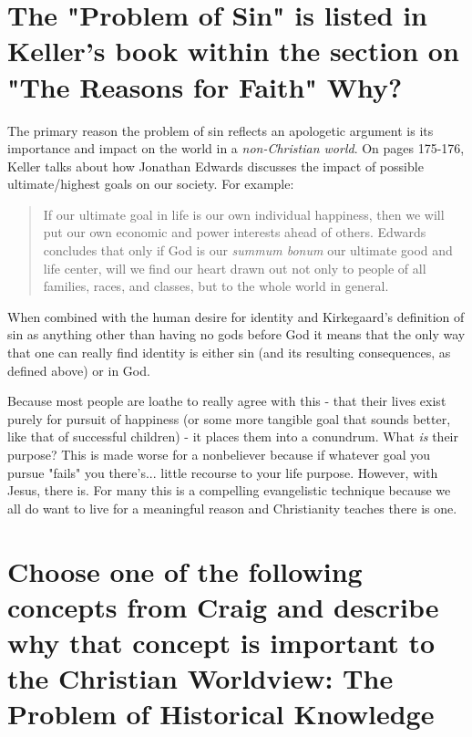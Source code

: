 \documentclass[12pt]{turabian-researchpaper}
\begin{document}
\section{The "Problem of Sin" is listed in Keller's book within the section on "The Reasons for Faith" Why? }

The primary reason the problem of sin reflects an apologetic argument is its importance and impact on the world in a \textit{non-Christian world}. On pages 175-176\autocite{keller2008reason}, Keller talks about how Jonathan Edwards discusses the impact of possible ultimate/highest goals on our society. For example:

\begin{quote}
If our ultimate goal in life is our own individual happiness, then we will put our own economic and power interests ahead of others. Edwards concludes that only if God is our \textit{summum bonum} our ultimate good and life center, will we find our heart drawn out not only to people of all families, races, and classes, but to the whole world in general.
\end{quote}

When combined with the human desire for identity and Kirkegaard's definition of sin as anything other than having no gods before God  it means that the only way that one can really find identity is either sin (and its resulting consequences, as defined above) or in God.

Because most people are loathe to really agree with this  - that their lives exist purely for pursuit of happiness (or some more tangible goal that sounds better, like that of successful children) - it places them into a conundrum. What \textit{is} their purpose? This is made worse for a nonbeliever because if whatever goal you pursue "fails" you there's... little recourse to your life purpose.  However, with Jesus, there is. For many this is a compelling evangelistic technique because we all do want to live for a meaningful reason and Christianity teaches there is one.

\section{Choose one of the following concepts from Craig and describe why that concept is important to the Christian Worldview: The Problem of Historical Knowledge}

\end{document}
